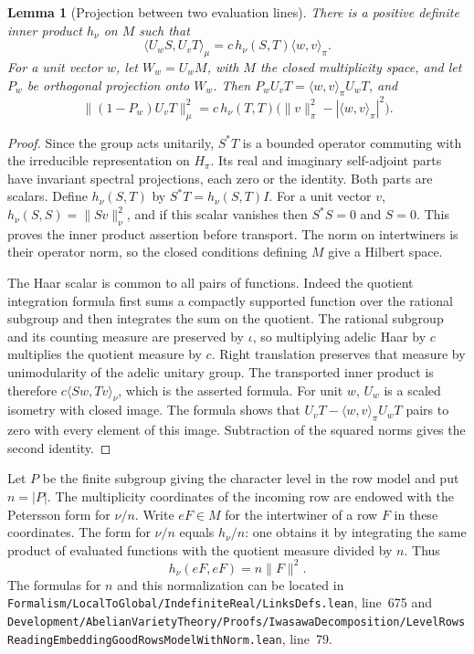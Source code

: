 \documentclass[a4paper,11pt]{article}
\newtheorem{lemma}[proposition]{Lemma}
\theoremstyle{definition}
\theoremstyle{remark}
\newcommand{\srcloc}[2]{{\small\nolinkurl{#1.lean}}, line~#2}
\numberwithin{equation}{section}
\begin{document}
\begin{lemma}[Projection between two evaluation lines]\leavevmode
\label{lem:rowoverlap441}
There is a positive definite inner product \(h_\nu\) on \(M\) such that
\[
  \langle U_w S,U_v T\rangle_\mu
       =c\,h_\nu(S,T)\langle w,v\rangle_\pi .
\]
For a unit vector \(w\), let \(W_w=U_w M\), with \(M\) the closed
multiplicity space, and let \(P_w\) be orthogonal projection onto
\(W_w\). Then \(P_w U_v T=\langle w,v\rangle_\pi U_w T\), and
\[
  \|(1-P_w)U_v T\|_\mu^2
     =c\,h_\nu(T,T)
         \bigl(\|v\|_\pi^2-|\langle w,v\rangle_\pi|^2\bigr).
\]
\end{lemma}
\begin{proof}
Since the group acts unitarily, \(S^*T\) is a bounded operator
commuting with the irreducible representation on \(H_\pi\).
Its real and imaginary self-adjoint parts have invariant spectral
projections, each zero or the identity. Both parts are scalars.
Define \(h_\nu(S,T)\) by \(S^*T=h_\nu(S,T)I\). For a unit vector
\(v\), \(h_\nu(S,S)=\|Sv\|_\nu^2\), and if this scalar vanishes
then \(S^*S=0\) and \(S=0\). This proves the inner product assertion
before transport. The norm on intertwiners is their operator norm,
so the closed conditions defining \(M\) give a Hilbert space.

The Haar scalar is common to all pairs of functions. Indeed the
quotient integration formula first sums a compactly supported
function over the rational subgroup and then integrates the sum on
the quotient. The rational subgroup and its counting measure are
preserved by \(\iota\), so multiplying adelic Haar by \(c\) multiplies
the quotient measure by \(c\). Right translation preserves that
measure by unimodularity of the adelic unitary group. The transported
inner product is therefore \(c\langle Sw,Tv\rangle_\nu\), which is
the asserted formula. For unit \(w\), \(U_w\) is a scaled isometry
with closed image. The formula shows that
\(U_vT-\langle w,v\rangle_\pi U_wT\) pairs to zero with every
element of this image. Subtraction of the squared norms gives the
second identity.
\end{proof}

Let \(P\) be the finite subgroup giving the character level in the
row model and put \(n=|P|\). The multiplicity coordinates of the
incoming row are endowed with the Petersson form for
\(\nu/n\). Write \(eF\in M\) for the intertwiner of a row \(F\)
in these coordinates. The form for \(\nu/n\) equals \(h_\nu/n\):
one obtains it by integrating the same product of evaluated functions
with the quotient measure divided by \(n\). Thus
\[
                    h_\nu(eF,eF)=n\|F\|^2 .
\]
The formulas for \(n\) and this normalization can be located in
\srcloc{Formalism/LocalToGlobal/IndefiniteReal/LinksDefs}{675}
and
\srcloc{Development/AbelianVarietyTheory/Proofs/IwasawaDecomposition/LevelRowsReadingEmbeddingGoodRowsModelWithNorm}{79}.
\end{document}
